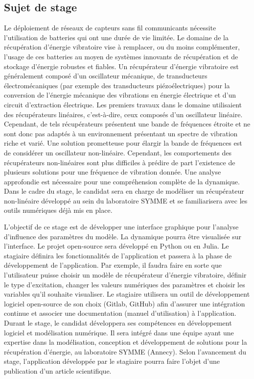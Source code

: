 \documentclass[a4paper, french, 12pt, titlepage]{report}
\begin{document}
\subsection{Sujet de stage}
Le déploiement de réseaux de capteurs sans fil communicants nécessite l’utilisation de batteries qui ont une durée de vie limitée. Le domaine de la récupération d’énergie vibratoire vise à remplacer, ou du moins complémenter, l’usage de ces batteries au moyen de systèmes innovants de récupération et de stockage d’énergie robustes et fiables. Un récupérateur d’énergie vibratoire est généralement composé d’un oscillateur mécanique, de transducteurs électromécaniques (par exemple des transducteurs piézoélectriques) pour la conversion de l’énergie mécanique des vibrations en énergie électrique et d’un circuit d’extraction électrique. Les premiers travaux dans le domaine utilisaient des récupérateurs linéaires, c’est-à-dire, ceux composés d’un oscillateur linéaire. Cependant, de tels récupérateurs présentent une bande de fréquences étroite et ne sont donc pas adaptés à un environnement présentant un spectre de vibration riche et varié. Une solution prometteuse pour élargir la bande de fréquences est de considérer un oscillateur non-linéaire. Cependant, les comportements des récupérateurs non-linéaires sont plus difficiles à prédire de part l’existence de plusieurs solutions pour une fréquence de vibration donnée. Une analyse approfondie est nécessaire pour une compréhension complète de la dynamique. Dans le cadre du stage, le candidat sera en charge de modéliser un récupérateur non-linéaire développé au sein du laboratoire SYMME et se familiarisera avec les outils numériques déjà mis en place.

L’objectif de ce stage est de développer une interface graphique pour l’analyse d’influence des paramètres du modèle. La dynamique pourra être visualisée sur l’interface. Le projet open-source sera développé en Python ou en Julia. Le stagiaire définira les fonctionnalités de l’application et passera à la phase de développement de l’application. Par exemple, il faudra faire en sorte que l’utilisateur puisse choisir un modèle de récupérateur d’énergie vibratoire, définir le type d’excitation, changer les valeurs numériques des paramètres et choisir les variables qu’il souhaite visualiser. Le stagiaire utilisera un outil de développement logiciel open-source de son choix (Gitlab, GitHub) afin d’assurer une intégration continue et associer une documentation (manuel d’utilisation) à l’application. Durant le stage, le candidat développera ses compétences en développement logiciel et modélisation numérique. Il sera intégré dans une équipe ayant une expertise dans la modélisation, conception et développement de solutions pour la récupération d’énergie, au laboratoire SYMME (Annecy). Selon l’avancement du stage, l’application développée par le stagiaire pourra faire l’objet d’une publication d’un article scientifique.
\end{document}
